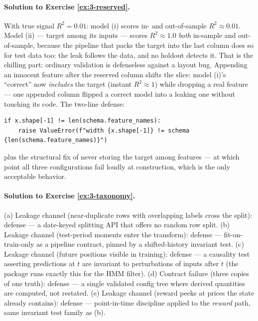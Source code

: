 \paragraph{Solution to Exercise \ref{ex:3-reserved}.}
With true signal $R^2 = 0.01$: model (i) scores in- and out-of-sample
$R^2 \approx 0.01$. Model (ii) --- target among its inputs --- scores
$R^2 \approx 1.0$ \emph{both} in-sample and out-of-sample, because the
pipeline that packs the target into the last column does so for test data
too: the leak follows the data, and no holdout detects it. That is the
chilling part: ordinary validation is defenseless against a layout bug.
Appending an innocent feature after the reserved column shifts the slice:
model (i)'s ``correct'' \code{[:, :-1]} now \emph{includes} the target
(instant $R^2 \approx 1$) while dropping a real feature --- one appended
column flipped a correct model into a leaking one without touching its
code. The two-line defense:
\begin{lstlisting}
if x.shape[-1] != len(schema.feature_names):
    raise ValueError(f"width {x.shape[-1]} != schema {len(schema.feature_names)}")
\end{lstlisting}
plus the structural fix of never storing the target among features --- at
which point all three configurations fail loudly at construction, which is
the only acceptable behavior.

\paragraph{Solution to Exercise \ref{ex:3-taxonomy}.}
(a) Leakage channel (near-duplicate rows with overlapping labels cross the
split): defense --- a date-keyed splitting API that offers no random row
split. (b) Leakage channel (test-period moments enter the transform):
defense --- fit-on-train-only as a pipeline contract, pinned by a
shifted-history invariant test. (c) Leakage channel (future positions
visible in training): defense --- a causality test asserting predictions
at $t$ are invariant to perturbations of inputs after $t$ (the package
runs exactly this for the HMM filter). (d) Contract failure (three copies
of one truth): defense --- a single validated config tree where derived
quantities are computed, not restated. (e) Leakage channel (reward peeks
at prices the state already contains): defense --- point-in-time
discipline applied to the \emph{reward} path, same invariant test family
as (b).


